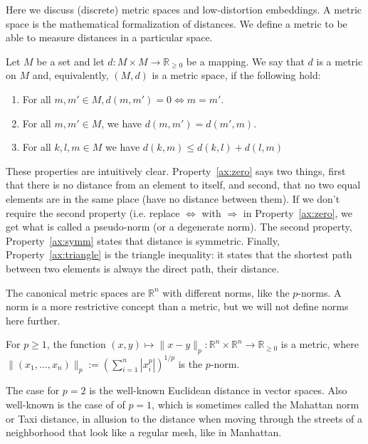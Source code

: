 Here we discuss (discrete) metric spaces and low-distortion embeddings.
A metric space is the mathematical formalization of distances. 
We define a metric to be able to measure distances in a particular space. 

\begin{defn}
Let $M$ be a set and let $d : M \times M \rightarrow \mathbb{R}_{\geq 0}$ be a mapping.
We say that $d$ is a metric on $M$ and, equivalently, $(M,d)$ is a metric space, if the following hold:
\begin{enumerate}
\item\label{ax:zero} For all $m,m' \in M, d(m,m') = 0 \Leftrightarrow m = m'$.
\item\label{ax:symm} For all $m,m' \in M$, we have $d(m,m') = d(m',m)$.
\item\label{ax:triangle} For all $k,l,m \in M$ we have $d(k,m) \leq d(k,l) + d(l,m)$
\end{enumerate}
\end{defn}

These properties are intuitively clear.
Property~\ref{ax:zero} says two things, first that there is no distance from an element to itself, and second, that no two equal elements are in the same place (have no distance between them).
If we don't require the second property (i.e. replace $\Leftrightarrow$ with $\Rightarrow$ in Property~\ref{ax:zero}, we get what is called a pseudo-norm (or a degenerate norm).
The second property, Property~\ref{ax:symm} states that distance is symmetric.
Finally, Property~\ref{ax:triangle} is the triangle inequality: it states that the shortest path between two elements is always the direct path, their distance.

The canonical metric spaces are $\mathbb{R}^n$ with different norms, like the $p$-norms.
A norm is a more restrictive concept than a metric, but we will not define norms here further.
\begin{ex}
    For $p \geq 1$, the function $(x,y) \mapsto \| x -y \|_p : \mathbb{R}^n \times \mathbb{R}^n \rightarrow \mathbb{R}_{\geq 0}$ is a metric, where 
    $\| (x_1,\ldots,x_n) \|_p := (\sum_{i=1}^n|x_i^p|)^{1/p}$ is the $p$-norm.
\end{ex}

The case for $p = 2$ is the well-known Euclidean distance in vector spaces.
Also well-known is the case of of $p=1$, which is sometimes called the Mahattan norm or Taxi distance, in allusion to the distance when moving through the streets of a neighborhood that look like a regular mesh, like in Manhattan.

